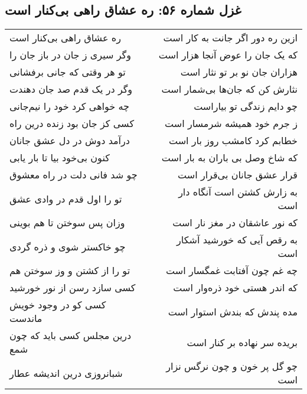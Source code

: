 \begin{center}
\section*{غزل شماره ۵۶: ره عشاق راهی بی‌کنار است}
\label{sec:056}
\begin{longtable}{l p{0.5cm} r}
ره عشاق راهی بی‌کنار است
&&
ازین ره دور اگر جانت به کار است
\\
وگر سیری ز جان در باز جان را
&&
که یک جان را عوض آنجا هزار است
\\
تو هر وقتی که جانی برفشانی
&&
هزاران جان نو بر تو نثار است
\\
وگر در یک قدم صد جان دهندت
&&
نثارش کن که جان‌ها بی‌شمار است
\\
چه خواهی کرد خود را نیم‌جانی
&&
چو دایم زندگی تو بیاراست
\\
کسی کز جان بود زنده درین راه
&&
ز جرم خود همیشه شرمسار است
\\
درآمد دوش در دل عشق جانان
&&
خطابم کرد کامشب روز بار است
\\
کنون بی‌خود بیا تا بار یابی
&&
که شاخ وصل بی باران به بار است
\\
چو شد فانی دلت در راه معشوق
&&
قرار عشق جانان بی‌قرار است
\\
تو را اول قدم در وادی عشق
&&
به زارش کشتن است آنگاه دار است
\\
وزان پس سوختن تا هم بوینی
&&
که نور عاشقان در مغز نار است
\\
چو خاکستر شوی و ذره گردی
&&
به رقص آیی که خورشید آشکار است
\\
تو را از کشتن و وز سوختن هم
&&
چه غم چون آفتابت غمگسار است
\\
کسی سازد رسن از نور خورشید
&&
که اندر هستی خود ذره‌وار است
\\
کسی کو در وجود خویش ماندست
&&
مده پندش که بندش استوار است
\\
درین مجلس کسی باید که چون شمع
&&
بریده سر نهاده بر کنار است
\\
شبانروزی درین اندیشه عطار
&&
چو گل پر خون و چون نرگس نزار است
\\
\end{longtable}
\end{center}
